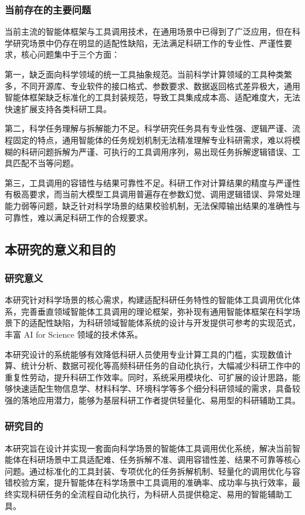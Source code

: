 \subsubsection{当前存在的主要问题}

当前主流的智能体框架与工具调用技术，在通用场景中已得到了广泛应用\cite{langchain2023,llamaindex2023}，但在科学研究场景中仍存在明显的适配性缺陷，无法满足科研工作的专业性、严谨性要求，核心问题集中于三个方面：

第一，缺乏面向科学领域的统一工具抽象规范。当前科学计算领域的工具种类繁多，不同开源库、专业软件的接口格式、参数要求、数据返回格式差异极大，通用智能体框架缺乏标准化的工具封装规范，导致工具集成成本高、适配难度大，无法快速扩展支持各类科研工具。

第二，科学任务理解与拆解能力不足。科学研究任务具有专业性强、逻辑严谨、流程固定的特点，通用智能体的任务规划机制无法精准理解专业科研需求\cite{yao2023react,wang2023plansolve}，难以将模糊的科研问题拆解为严谨、可执行的工具调用序列，易出现任务拆解逻辑错误、工具匹配不当等问题。

第三，工具调用的容错性与结果可靠性不足。科研工作对计算结果的精度与严谨性有极高要求，而当前大模型工具调用普遍存在参数幻觉、调用逻辑错误、异常处理能力弱等问题\cite{schick2023toolformer,qin2023toollearning}，缺乏针对科学场景的结果校验机制，无法保障输出结果的准确性与可靠性，难以满足科研工作的合规要求。

\subsection{本研究的意义和目的}

\subsubsection{研究意义}

本研究针对科学场景的核心需求，构建适配科研任务特性的智能体工具调用优化体系，完善垂直领域智能体工具调用的理论框架，弥补现有通用智能体框架在科学场景下的适配性缺陷，为科研领域智能体系统的设计与开发提供可参考的实现范式，丰富 AI for Science 领域的技术体系\cite{jumper2021alphafold,butler2018ml4mat}。

本研究设计的系统能够有效降低科研人员使用专业计算工具的门槛，实现数值计算、统计分析、数据可视化等高频科研任务的自动化执行，大幅减少科研工作中的重复性劳动，提升科研工作效率。同时，系统采用模块化、可扩展的设计思路，能够快速适配生物信息学、材料科学、环境科学等多个细分科研领域的需求\cite{butler2018ml4mat}，具备较强的落地应用潜力，能够为基层科研工作者提供轻量化、易用型的科研辅助工具。

\subsubsection{研究目的}

本研究旨在设计并实现一套面向科学场景的智能体工具调用优化系统，解决当前智能体在科研场景中工具适配难、任务拆解不准、调用容错性差、结果不可靠等核心问题\cite{yao2023react,schick2023toolformer,qin2023toollearning}。通过标准化的工具封装、专项优化的任务拆解机制、轻量化的调用优化与容错校验方案，提升智能体在科学场景中工具调用的准确率、成功率与执行效率，最终实现科研任务的全流程自动化执行，为科研人员提供稳定、易用的智能辅助工具。
